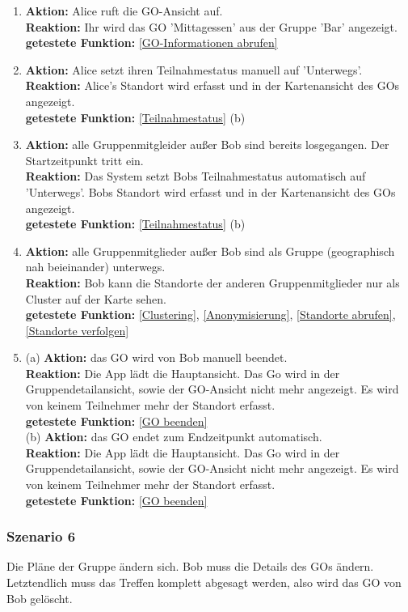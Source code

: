 \documentclass[parskip=full]{scrartcl}
\def\threedigits#1{%
  \ifnum#1<100 0\fi
  \ifnum#1<10 0\fi
  \number#1}
\begin{document}
\begin{enumerate}[label={\textbf{/T\protect\threedigits{\theenumi}0/}}, leftmargin=*, resume]
	\item \textbf{Aktion:} Alice ruft die GO-Ansicht auf.\\
	\textbf{Reaktion:} Ihr wird das GO 'Mittagessen' aus der Gruppe 'Bar' angezeigt.\\
	\textbf{getestete Funktion:} \ref{GO-Informationen abrufen}
	\item \textbf{Aktion:} Alice setzt ihren Teilnahmestatus manuell auf 'Unterwegs'.\\
	\textbf{Reaktion:} Alice's Standort wird erfasst und in der Kartenansicht des GOs angezeigt.\\
	\textbf{getestete Funktion:} \ref{Teilnahmestatus} (b)
	\item \textbf{Aktion:} alle Gruppenmitgleider außer Bob sind bereits losgegangen. Der Startzeitpunkt tritt ein.\\
	\textbf{Reaktion:} Das System setzt Bobs Teilnahmestatus automatisch auf 'Unterwegs'. Bobs Standort wird erfasst und in der Kartenansicht des GOs angezeigt.\\
	\textbf{getestete Funktion: }\ref{Teilnahmestatus} (b)
	\item \textbf{Aktion:} alle Gruppenmitglieder außer Bob sind als Gruppe (geographisch nah beieinander) unterwegs.\\
	\textbf{Reaktion: }Bob kann die Standorte der anderen Gruppenmitglieder nur als Cluster auf der Karte sehen.\\
	\textbf{getestete Funktion:} \ref{Clustering}, \ref{Anonymisierung}, \ref{Standorte abrufen}, \ref{Standorte verfolgen}
	\item (a) \textbf{Aktion:} das GO wird von Bob manuell beendet. \\
	\textbf{Reaktion: }Die App lädt die Hauptansicht. Das Go wird in der Gruppendetailansicht, sowie der GO-Ansicht nicht mehr angezeigt. Es wird von keinem Teilnehmer mehr der Standort erfasst.\\
	\textbf{getestete Funktion:} \ref{GO beenden}\\
	 (b) \textbf{Aktion:} das GO endet zum Endzeitpunkt automatisch.\\
	 \textbf{Reaktion: }Die App lädt die Hauptansicht. Das Go wird in der Gruppendetailansicht, sowie der GO-Ansicht nicht mehr angezeigt. Es wird von keinem Teilnehmer mehr der Standort erfasst.\\	
	 \textbf{getestete Funktion:} \ref{GO beenden}
\end{enumerate}

\subsubsection*{Szenario 6} Die Pläne der Gruppe ändern sich. Bob muss die Details des GOs ändern. Letztendlich muss das Treffen komplett abgesagt werden, also wird das GO von Bob gelöscht.\\
\end{document}
